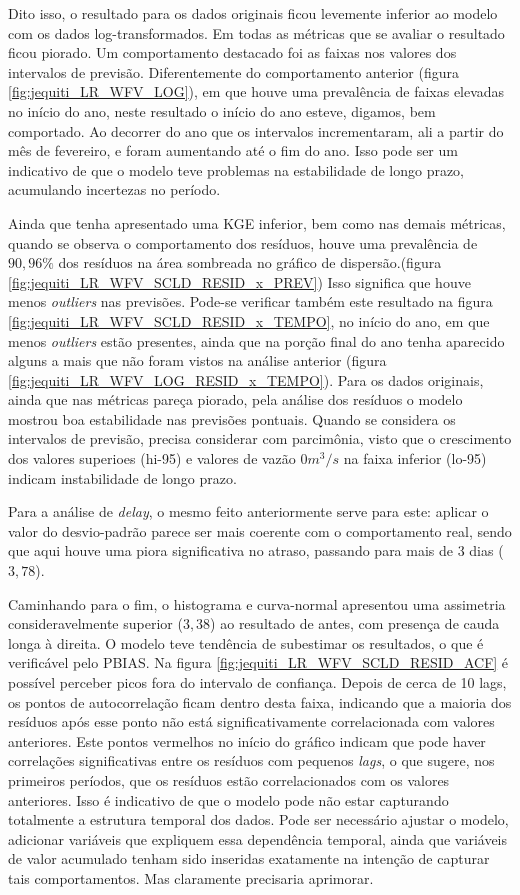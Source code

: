 Dito isso, o resultado para os dados originais ficou levemente inferior ao modelo com os dados log-transformados. Em todas as métricas que se avaliar o resultado ficou piorado. Um comportamento destacado foi as faixas nos valores dos intervalos de previsão. Diferentemente do comportamento anterior (figura \ref{fig:jequiti_LR_WFV_LOG}), em que houve uma prevalência de faixas elevadas no início do ano, neste resultado o início do ano esteve, digamos, bem comportado. Ao decorrer do ano que os intervalos incrementaram, ali a partir do mês de fevereiro, e foram aumentando até o fim do ano. Isso pode ser um indicativo de que o modelo teve problemas na estabilidade de longo prazo, acumulando incertezas no período.

Ainda que tenha apresentado uma KGE inferior, bem como nas demais métricas, quando se observa o comportamento dos resíduos, houve uma prevalência de $90,96\%$ dos resíduos na área sombreada no gráfico de dispersão.(figura \ref{fig:jequiti_LR_WFV_SCLD_RESID_x_PREV}) Isso significa que houve menos \textit{outliers} nas previsões. Pode-se verificar também este resultado na figura \ref{fig:jequiti_LR_WFV_SCLD_RESID_x_TEMPO}, no início do ano, em que menos \textit{outliers} estão presentes, ainda que na porção final do ano tenha aparecido alguns a mais que não foram vistos na análise anterior (figura \ref{fig:jequiti_LR_WFV_LOG_RESID_x_TEMPO}). Para os dados originais, ainda que nas métricas pareça piorado, pela análise dos resíduos o modelo mostrou boa estabilidade nas previsões pontuais. Quando se considera os intervalos de previsão, precisa considerar com parcimônia, visto que o crescimento dos valores superioes (hi-95) e valores de vazão $0 m^3/s$ na faixa inferior (lo-95) indicam instabilidade de longo prazo.

Para a análise de \textit{delay}, o mesmo feito anteriormente serve para este: aplicar o valor do desvio-padrão parece ser mais coerente com o comportamento real, sendo que aqui houve uma piora significativa no atraso, passando para mais de 3 dias ($3,78$).

Caminhando para o fim, o histograma e curva-normal apresentou uma assimetria consideravelmente superior ($3,38$) ao resultado de antes, com presença de cauda longa à direita. O modelo teve tendência de subestimar os resultados, o que é verificável pelo PBIAS. Na figura \ref{fig:jequiti_LR_WFV_SCLD_RESID_ACF} é possível perceber picos fora do intervalo de confiança. Depois de cerca de 10 lags, os pontos de autocorrelação ficam dentro desta faixa, indicando que a maioria dos resíduos após esse ponto não está significativamente correlacionada com valores anteriores. Este pontos vermelhos no início do gráfico indicam que pode haver correlações significativas entre os resíduos com pequenos \textit{lags}, o que sugere, nos primeiros períodos, que os resíduos estão correlacionados com os valores anteriores. Isso é indicativo de que o modelo pode não estar capturando totalmente a estrutura temporal dos dados. Pode ser necessário ajustar o modelo, adicionar variáveis que expliquem essa dependência temporal, ainda que variáveis de valor acumulado tenham sido inseridas exatamente na intenção de capturar tais comportamentos. Mas claramente precisaria aprimorar.

